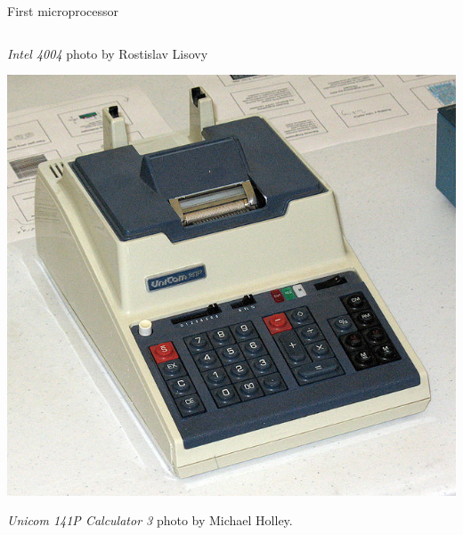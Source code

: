 \begin{frame}[t]{First microprocessor}
\begin{columns}[T]
\begin{column}{.3\textwidth}
    \begin{tiny}
      \emph{Intel 4004} photo by Rostislav Lisovy\\
    \end{tiny}
    \vspace{1em}
    \includegraphics[width=.8\textwidth]{images/i4004-calculator.jpg}\\
    \begin{tiny}
      \emph{Unicom 141P Calculator 3} photo by Michael Holley.\\ 
    \end{tiny}
  \end{column}
\end{columns}
\end{frame}

